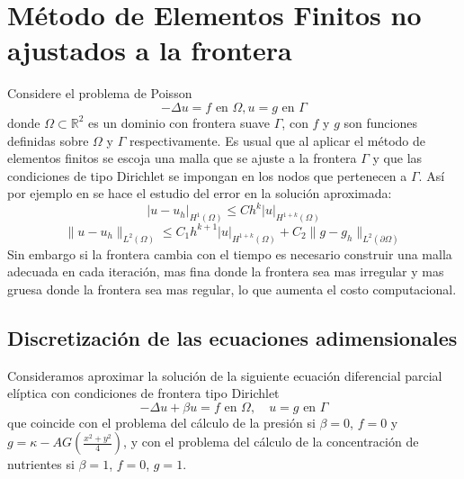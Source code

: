 \section{Método de Elementos Finitos no ajustados a la frontera}
Considere el problema de Poisson
\[
-\Delta u = f\text{ en }\Omega, u=g\text{ en }\Gamma 
\]
donde $\Omega\subset\mathbb{R}^2$ es un dominio con frontera suave $\Gamma$, con $f$ y $g$ son funciones definidas sobre $\Omega$ y $\Gamma$ respectivamente. Es usual que al aplicar el método de elementos finitos se escoja una malla que se ajuste a la frontera  $\Gamma$ y que las condiciones de tipo Dirichlet se impongan en los nodos que pertenecen a $\Gamma$. Así por ejemplo en \citep[Teorema 33.2 en p.~127]{ern2021finite} se hace el estudio del error en la solución aproximada:
\[
|u-u_h|_{H^1{(\Omega)}}\leq Ch^{k}|u|_{H^{1+k}(\Omega)}
\]
\[
\|u-u_h\|_{L^2{(\Omega)}}\leq C_1 h^{k+1}|u|_{H^{1+k}(\Omega)}+C_2\|g-g_h\|_{L^2(\partial \Omega)}
\]
Sin embargo si la frontera cambia con el tiempo es necesario construir una malla adecuada en cada iteración, mas fina donde la frontera sea mas irregular y mas gruesa donde la frontera sea mas regular, lo que aumenta el costo computacional.


\subsection{Discretización de las ecuaciones adimensionales }
Consideramos aproximar la solución de la siguiente ecuación diferencial parcial elíptica con condiciones de frontera tipo Dirichlet
\begin{equation}
	-\Delta u+\beta u  = f \text{ en }  \Omega,\quad 	u = g \text{ en } \Gamma
	\label{eqn:edpmodelo}
\end{equation}
que coincide con el problema del cálculo de la presión si $\beta=0$, $f=0$ y $g=\kappa-AG\left(\frac{x^2+y^2}{4}\right)$, y con el problema del cálculo de la concentración de nutrientes si $\beta=1$, $f=0$, $g=1$.

